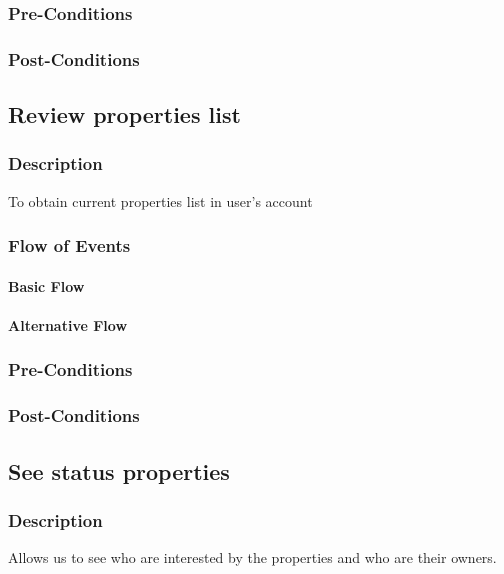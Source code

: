 \documentclass[a4paper,12pt]{article}
\begin{document}
\subsubsection{Pre-Conditions}
\subsubsection{Post-Conditions}

\subsection{Review properties list}
\subsubsection{Description}
To obtain current properties list in user's account
\subsubsection{Flow of Events}
\paragraph{Basic Flow}
\begin{itemize}
\end{itemize}

\paragraph{Alternative Flow}
\begin{itemize}
\end{itemize}

\subsubsection{Pre-Conditions}
\subsubsection{Post-Conditions}

\subsection{See status properties}
\subsubsection{Description}
Allows us to see who are interested by the properties and who are their owners.
\end{document}
